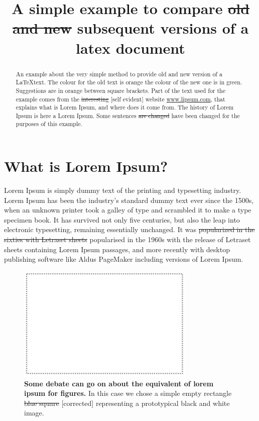 \documentclass[]{article}
\title{A simple example to compare  
\color{Orange}
\st{old and new}
\color{ForestGreen}
subsequent
\color{Black}
versions of a latex document}
\author{}
\begin{document}
\maketitle

\begin{abstract}
An example about the very simple method to provide old and new version of a \LaTeX text. The colour for the old text is orange the colour of the new one is in green. Suggestions are in orange between square brackets. Part of the text used for the example comes from the 
\color{Orange}
\st{interesting} [self evident]
\color{Black}
website \href{www.lipsum.com}{www.lipsum.com}, that explains what is Lorem Ipsum, and where does it come from.
The history of Lorem Ipsum is here a Lorem Ipsum.
Some sentences 
\color{Orange}
\st{are changed}
\color{ForestGreen}
have been 
\color{Black}
changed for the purposes of this example.

\color{Orange}
\color{Black}



\end{abstract}

\section{What is Lorem Ipsum?}

Lorem Ipsum is simply dummy text of the printing and typesetting industry. Lorem Ipsum has been the industry's standard dummy text ever since the 1500s, when an unknown printer took a galley of type and scrambled it to make a type specimen book. It has survived not only five centuries, but also the leap into electronic typesetting, remaining essentially unchanged. It was 
\color{Orange}
\st{popularized in the sixties with Letraset sheets}
\color{ForestGreen}
popularised in the 1960s with the release of Letraset sheets 
\color{Black}
containing Lorem Ipsum passages, and more recently with desktop publishing software like Aldus PageMaker including versions of Lorem Ipsum.

\begin{figure}[ht]
\centering
\hspace{-0.5cm}
\includegraphics[width=8.5cm]{figures/lorem_ipsum_figure.pdf}
\caption{{\bf Some debate can go on about the equivalent of lorem ipsum for figures.} 
In this case we chose a simple 
\color{ForestGreen}
empty rectangle 
\color{Orange}
\st{blue square}
[corrected]
\color{Black}
representing a prototypical black and white image.}
\label{fig:f2}
\end{figure}
\end{document}
